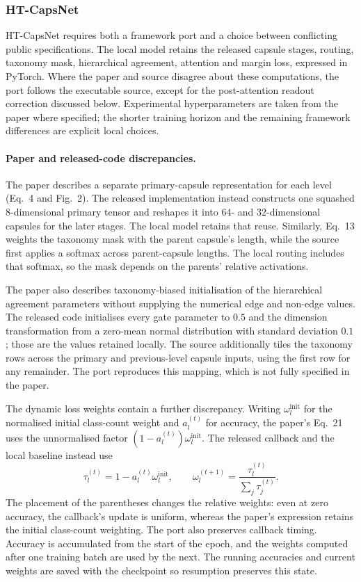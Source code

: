 \subsubsection{HT-CapsNet}
\label{sssec:fidelity_htcapsnet}

HT-CapsNet requires both a framework port and a choice between conflicting
public specifications. The local model retains the released capsule stages,
routing, taxonomy mask, hierarchical agreement, attention and margin loss,
expressed in PyTorch. Where the paper and source disagree about these
computations, the port follows the executable source, except for the
post-attention readout correction discussed below. Experimental hyperparameters
are taken from the paper \cite{noor2025taxonomy} where specified; the shorter
training horizon and the remaining framework differences are explicit local
choices.

\paragraph{Paper and released-code discrepancies.}
The paper describes a separate primary-capsule representation for each level
(Eq.~4 and Fig.~2). The released implementation instead constructs one
squashed $8$-dimensional primary tensor and reshapes it into $64$- and
$32$-dimensional capsules for the later stages. The local model retains that
reuse. Similarly, Eq.~13 weights the taxonomy mask with the parent capsule's
length, while the source first applies a softmax across parent-capsule
lengths. The local routing includes that softmax, so the mask depends on the
parents' relative activations.

The paper also describes taxonomy-biased initialisation of the hierarchical
agreement parameters without supplying the numerical edge and non-edge
values. The released code initialises every gate parameter to $0.5$ and the
dimension transformation from a zero-mean normal distribution with standard
deviation $0.1$; those are the values retained locally. The source additionally
tiles the taxonomy rows across the primary and previous-level capsule inputs,
using the first row for any remainder. The port reproduces this mapping, which
is not fully specified in the paper.

The dynamic loss weights contain a further discrepancy. Writing
$\omega_l^{\mathrm{init}}$ for the normalised initial class-count weight and
$a_l^{(t)}$ for accuracy, the paper's Eq.~21 uses the unnormalised factor
$(1-a_l^{(t)})\omega_l^{\mathrm{init}}$. The released callback and the local
baseline instead use
\[
\tau_l^{(t)}=1-a_l^{(t)}\omega_l^{\mathrm{init}},
\qquad
\omega_l^{(t+1)}=\frac{\tau_l^{(t)}}{\sum_j\tau_j^{(t)}}.
\]
The placement of the parentheses changes the relative weights: even at zero
accuracy, the callback's update is uniform, whereas the paper's expression
retains the initial class-count weighting. The port also preserves callback
timing. Accuracy is accumulated from the start of the epoch, and the weights
computed after one training batch are used by the next. The running
accuracies and current weights are saved with the checkpoint so resumption
preserves this state.

